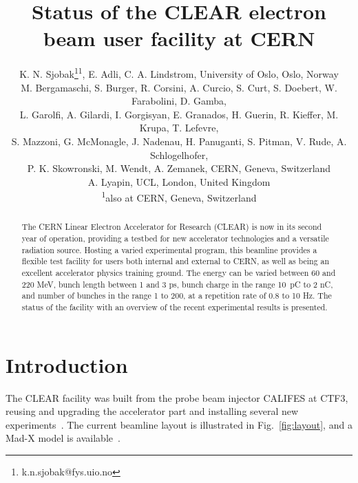 \documentclass[a4paper,
               keeplastbox,   %
               ]{jacow}
\begin{document}
\title{Status of the CLEAR electron beam user facility at CERN}

\author{K. N. Sjobak\thanks{k.n.sjobak@fys.uio.no}\textsuperscript{1}, E. Adli, C. A. Lindstrom, University of Oslo, Oslo, Norway\\
  M. Bergamaschi, S. Burger, R. Corsini, A. Curcio, S. Curt, S. Doebert, W. Farabolini, D. Gamba,\\
  L. Garolfi, A. Gilardi, I. Gorgisyan, E. Granados, H. Guerin, R. Kieffer, M. Krupa, T. Lefevre,\\
  S. Mazzoni, G. McMonagle, J. Nadenau, H. Panuganti, S. Pitman, V. Rude, A. Schlogelhofer,\\
  P. K. Skowronski, M. Wendt, A. Zemanek, CERN, Geneva, Switzerland \\
  A. Lyapin, UCL, London, United Kingdom \\
  \textsuperscript{1}also at CERN, Geneva, Switzerland}

\maketitle

%
\begin{abstract}
  The CERN Linear Electron Accelerator for Research (CLEAR) is now in its second year of operation, providing a testbed for new accelerator technologies and a versatile radiation source.
  Hosting a varied experimental program, this beamline provides a flexible test facility for users both internal and external to CERN, as well as being an excellent accelerator physics training ground.
  The energy can be varied between 60 and 220 MeV, bunch length between 1 and 3 ps, bunch charge in the range 10~pC to 2 nC, and number of bunches in the range 1 to 200, at a repetition rate of 0.8 to 10 Hz.
  The status of the facility with an overview of the recent experimental results is presented.
\end{abstract}

\section{Introduction}

The CLEAR facility was built from the probe beam injector CALIFES at CTF3, reusing and upgrading the accelerator part and installing several new experiments~\cite{Gamba::CLEAR,Corsini:FirstCLEAR}.
The current beamline layout is illustrated in Fig.~\ref{fig:layout}, and a Mad-X model is available~\cite{CLEAR-MADX}.
\end{document}

